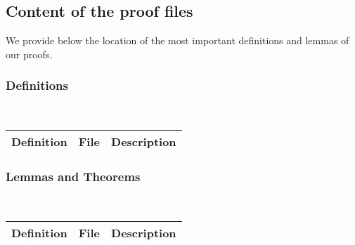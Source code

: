 \subsection{Content of the proof files}
\label{appendix:proof-files}

We provide below the location of the most important definitions and lemmas of our proofs.

\subsubsection{Definitions}
~
\begin{table}[h]
  \begin{tabular}{ l | l | l }
    Definition & File & Description \\
    \hline
\end{tabular}
\end{table}

\subsubsection{Lemmas and Theorems}
~
\begin{table}[h]
  \begin{tabular}{ l | l | l }
    Definition & File & Description \\
    \hline
\end{tabular}
\end{table}


